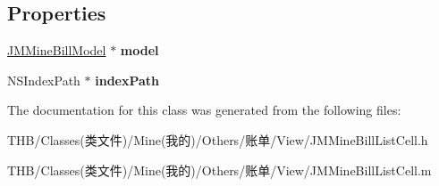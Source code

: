 \subsection*{Properties}
\begin{DoxyCompactItemize}
\item 
\mbox{\label{interface_j_m_mine_bill_list_cell_afdca5ee492f07808041d9c4e07b60415}} 
\mbox{\hyperlink{interface_j_m_mine_bill_model}{J\+M\+Mine\+Bill\+Model}} $\ast$ {\bfseries model}
\item 
\mbox{\label{interface_j_m_mine_bill_list_cell_a4e96aab078e421a1b65b74595a032ae9}} 
N\+S\+Index\+Path $\ast$ {\bfseries index\+Path}
\end{DoxyCompactItemize}


The documentation for this class was generated from the following files\+:\begin{DoxyCompactItemize}
\item 
T\+H\+B/\+Classes(类文件)/\+Mine(我的)/\+Others/账单/\+View/J\+M\+Mine\+Bill\+List\+Cell.\+h\item 
T\+H\+B/\+Classes(类文件)/\+Mine(我的)/\+Others/账单/\+View/J\+M\+Mine\+Bill\+List\+Cell.\+m\end{DoxyCompactItemize}
